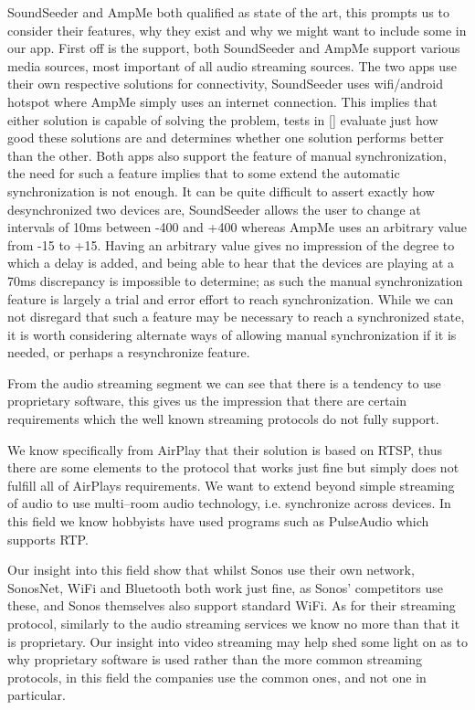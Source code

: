 SoundSeeder and AmpMe both qualified as state of the art, this prompts us to consider their features, why they exist and why we might want to include some in our app.
First off is the support, both SoundSeeder and AmpMe support various media sources, most important of all audio streaming sources.
The two apps use their own respective solutions for connectivity, SoundSeeder uses wifi/android hotspot where AmpMe simply uses an internet connection.
This implies that either solution is capable of solving the problem, tests in \cref{} evaluate just how good these solutions are and determines whether one solution performs better than the other.
Both apps also support the feature of manual synchronization, the need for such a feature implies that to some extend the automatic synchronization is not enough.
It can be quite difficult to assert exactly how desynchronized two devices are, SoundSeeder allows the user to change at intervals of 10ms between -400 and +400 whereas AmpMe uses an arbitrary value from -15 to +15.
Having an arbitrary value gives no impression of the degree to which a delay is added, and being able to hear that the devices are playing at a 70ms discrepancy is impossible to determine; as such the manual synchronization feature is largely a trial and error effort to reach synchronization.
While we can not disregard that such a feature may be necessary to reach a synchronized state, it is worth considering alternate ways of allowing manual synchronization if it is needed, or perhaps a resynchronize feature.

\bigskip \noindent
From the audio streaming segment we can see that there is a tendency to use proprietary software, this gives us the impression that there are certain requirements which the well known streaming protocols do not fully support. 

We know specifically from AirPlay that their solution is based on \ac{RTSP}, thus there are some elements to the protocol that works just fine but simply does not fulfill all of AirPlays requirements.
We want to extend beyond simple streaming of audio to use multi--room audio technology, i.e. synchronize across devices.
In this field we know hobbyists have used programs such as PulseAudio which supports \ac{RTP}.

Our insight into this field show that whilst Sonos use their own network, SonosNet, WiFi and Bluetooth both work just fine, as Sonos' competitors use these, and Sonos themselves also support standard WiFi.
As for their streaming protocol, similarly to the audio streaming services we know no more than that it is proprietary.
Our insight into video streaming may help shed some light on as to why proprietary software is used rather than the more common streaming protocols, in this field the companies use the common ones, and not one in particular.

